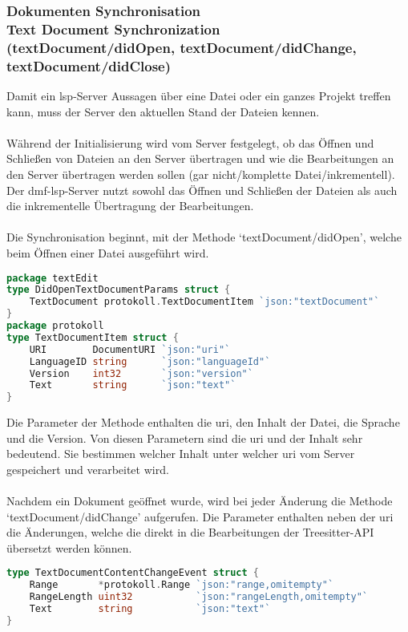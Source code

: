 \documentclass[./einleitung.tex]{subfiles}
\begin{document}
    \subsubsection[Dokumenten Synchronisation]{Dokumenten Synchronisation\\ {\textnormal{\footnotesize Text Document Synchronization \\ (textDocument/didOpen, textDocument/didChange, textDocument/didClose) \cite{dokumente}}}}\label{subsubsec:dokumenten-synchronisation}
    Damit ein \acrshort{lsp}-Server Aussagen über eine Datei oder ein ganzes Projekt treffen kann, muss der Server den aktuellen Stand der Dateien kennen.
    \\\\
    Während der Initialisierung wird vom Server festgelegt, ob das Öffnen und Schließen von Dateien an den Server übertragen und wie die Bearbeitungen an den Server übertragen werden sollen (gar nicht/komplette Datei/inkrementell).
    Der \acrshort{dmf}-\acrshort{lsp}-Server nutzt sowohl das Öffnen und Schließen der Dateien als auch die inkrementelle Übertragung der Bearbeitungen.
    \\\\
    Die Synchronisation beginnt, mit der Methode `textDocument/didOpen', welche beim Öffnen einer Datei ausgeführt wird.
    \begin{lstlisting}[language=Go,title=Definition der Parameter aus zwei Packages, label=lst:dokumenteParams]
package textEdit
type DidOpenTextDocumentParams struct {
	TextDocument protokoll.TextDocumentItem `json:"textDocument"`
}
package protokoll
type TextDocumentItem struct {
	URI        DocumentURI `json:"uri"`
	LanguageID string      `json:"languageId"`
	Version    int32       `json:"version"`
	Text       string      `json:"text"`
}
    \end{lstlisting}
    Die Parameter der Methode enthalten die \acrfull{uri}, den Inhalt der Datei, die Sprache und die Version.
    Von diesen Parametern sind die \acrshort{uri} und der Inhalt sehr bedeutend.
    Sie bestimmen welcher Inhalt unter welcher \acrshort{uri} vom Server gespeichert und verarbeitet wird.
    \\\\
    Nachdem ein Dokument geöffnet wurde, wird bei jeder Änderung die Methode `textDocument/didChange' aufgerufen.
    Die Parameter enthalten neben der \acrshort{uri} die Änderungen, welche die direkt in die Bearbeitungen der Treesitter-API übersetzt werden können.
    \begin{lstlisting}[language=Go, title=Definition der Bearbeitungen, label=lst:dokumenteBearbeitung]
type TextDocumentContentChangeEvent struct {
	Range       *protokoll.Range `json:"range,omitempty"`
	RangeLength uint32           `json:"rangeLength,omitempty"`
	Text        string           `json:"text"`
}
    \end{lstlisting}
\end{document}
